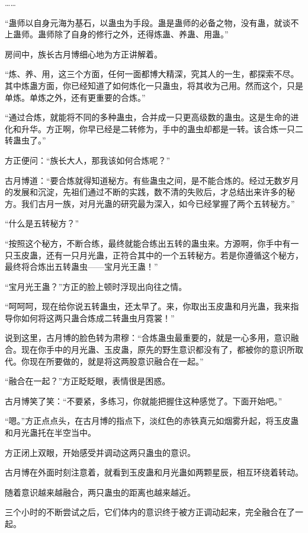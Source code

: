\begin{this_body}
……

“蛊师以自身元海为基石，以蛊虫为手段。蛊是蛊师的必备之物，没有蛊，就谈不上蛊师。蛊师除了自身的修行之外，还得炼蛊、养蛊、用蛊。”

房间中，族长古月博细心地为方正讲解着。

“炼、养、用，这三个方面，任何一面都博大精深，究其人的一生，都探索不尽。其中炼蛊方面，你已经知道了如何炼化一只蛊虫，将其收为己用。然而这个，只是单炼。单炼之外，还有更重要的合炼。”

“通过合炼，就能将不同的多种蛊虫，合并成一只更高级数的蛊虫。这是生命的进化和升华。方正啊，你早已经是二转修为，手中的蛊虫却都是一转。该合炼一只二转蛊虫了。”

方正便问：“族长大人，那我该如何合炼呢？”

古月博道：“要合炼就得知道秘方。有些蛊虫之间，是不能合炼的。经过无数岁月的发展和沉淀，先祖们通过不断的实践，数不清的失败后，才总结出来许多的秘方。我们古月一族，对月光蛊的研究最为深入，如今已经掌握了两个五转秘方。”

“什么是五转秘方？”

“按照这个秘方，不断合练，最终就能合练出五转的蛊虫来。方源啊，你手中有一只玉皮蛊，还有一只月光蛊，正符合其中的一个五转秘方。若是你遵循这个秘方，最终将合炼出五转蛊虫——宝月光王蛊！”

“宝月光王蛊？”方正的脸上顿时浮现出向往之情。

“呵呵呵，现在给你说五转蛊虫，还太早了。来，你取出玉皮蛊和月光蛊，我来指导你如何将这两只蛊合炼成二转蛊虫月霓裳！”

说到这里，古月博的脸色转为肃穆：“合炼蛊虫最重要的，就是一心多用，意识融合。现在你手中的月光蛊、玉皮蛊，原先的野生意识都没有了，都被你的意识所取代。你现在所要做的，就是将这两股意识融合在一起。”

“融合在一起？”方正眨眨眼，表情很是困惑。

古月博笑了笑：“不要紧，多练习，你就能把握住这种感觉了。下面开始吧。”

“嗯。”方正点点头，在古月博的指点下，淡红色的赤铁真元如烟雾升起，将玉皮蛊和月光蛊托在半空当中。

方正闭上双眼，开始感受并调动这两只蛊虫的意识。

古月博在外面时刻注意着，就看到玉皮蛊和月光蛊如两颗星辰，相互环绕着转动。

随着意识越来越融合，两只蛊虫的距离也越来越近。

三个小时的不断尝试之后，它们体内的意识终于被方正调动起来，完全融合在了一起。


\end{this_body}
